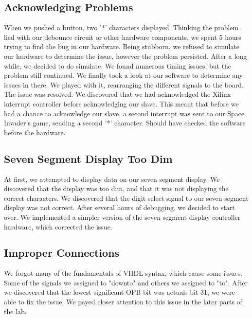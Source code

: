 \documentclass[11pt,letter,oneside]{report}
\begin{document}
\subsection{Acknowledging Problems}
When we pushed a button, two '*' characters displayed. Thinking the problem lied with our debounce circuit or other hardware components, we spent 5 hours trying to find the bug in our hardware. Being stubborn, we refused to simulate our hardware to determine the issue, however the problem persisted. After a long while, we decided to do simulate. We found numerous timing issues, but the problem still continued. We finally took a look at our software to determine any issues in there. We played with it, rearranging the different signals to the board. The issue was resolved. We discovered that we had acknowledged the Xilinx interrupt controller before acknowledging our slave. This meant that before we had a chance to acknowledge our slave, a second interrupt was sent to our Space Invader's game, sending a second '*' character. Should have checked the software before the hardware.

\subsection{Seven Segment Display Too Dim}
At first, we attempted to display data on our seven segment display. We discovered that the display was too dim, and that it was not displaying the correct characters. We discovered that the digit select signal to our seven segment display was not correct. After several hours of debugging, we decided to start over. We implemented a simpler version of the seven segment display controller hardware, which corrected the issue.

\subsection{Improper Connections}
We forgot many of the fundamentals of VHDL syntax, which cause some issues. Some of the signals we assigned to "downto" and others we assigned to "to". After we discovered that the lowest significant OPB bit was actuals bit 31, we were able to fix the issue. We payed closer attention to this issue in the later parts of the lab. 
\end{document}
